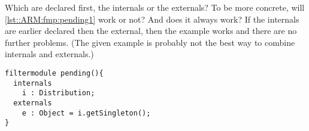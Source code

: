 Which are declared first, the internals or the externals? 
To be more concrete, will \autoref{lst::ARM:fmp:pending1} work or not? 
And does it always work? 
If the internals are earlier declared then the external, then the example works and there are no further problems. 
(The given example is probably not the best way to combine internals and externals.)

\begin{lstlisting}[caption = {A filtermodule with an external from an internal},label=lst::ARM:fmp:pending1,style=listing,language=ComposeStar,float=tpb]
filtermodule pending(){
  internals
    i : Distribution;
  externals
    e : Object = i.getSingleton();
}
\end{lstlisting}